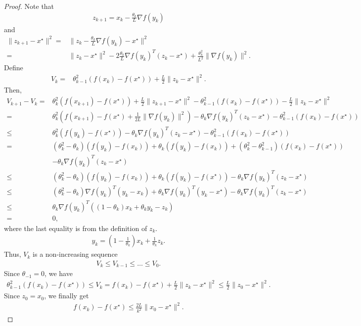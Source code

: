 \documentclass{article}
\begin{document}
\begin{proof}
    Note that 
    \begin{align}
        z_{k+1} = x_k - \frac{\theta_k}{L}\nabla f(y_k)
    \end{align}
    and 
    \begin{align}
        \|z_{k+1}-x^\star\|^2 =&  \| z_k - \frac{\theta_k}{L}\nabla f(y_k)-x^\star\|^2 \\
        =& \|z_k - x^\star\|^2 -2\frac{\theta_k}{L} \nabla f(y_k)^T (z_k - x^\star) + \frac{\theta_k^2}{L^2} \|\nabla f(y_k)\|^2.
    \end{align}
    Define
    \begin{align}
        V_k =& \theta_{k-1}^2 (f(x_k)-f(x^\star)) + \frac{L}{2}\|z_k-x^\star\|^2.
    \end{align}
    Then,
    \begin{align}
        V_{k+1}-V_k =&  \theta_{k}^2 (f(x_{k+1})-f(x^\star)) + \frac{L}{2}\|z_{k+1}-x^\star\|^2
        -\theta_{k-1}^2 (f(x_k)-f(x^\star)) - \frac{L}{2}\|z_k-x^\star\|^2\\
        =& \theta_k^2 \left( f(x_{k+1})- f(x^\star) + \frac{1}{2L}\|\nabla f(y_k)\|^2\right) -\theta_k \nabla f(y_k)^T (z_k - x^\star)  -\theta_{k-1}^2 (f(x_k)-f(x^\star)) \\
        \leq& \theta_k^2 \left( f(y_{k})- f(x^\star)\right) -\theta_k \nabla f(y_k)^T (z_k - x^\star)  -\theta_{k-1}^2 (f(x_k)-f(x^\star)) \\
        =& (\theta_k^2 -\theta_k)( f(y_k) - f(x_k)) + \theta_k (f(y_k)- f(x_k)) + (\theta_k^2-\theta_{k-1}^2)(f(x_k)-f(x^\star))\nonumber\\
        &-\theta_k \nabla f(y_k)^T (z_k-x^\star)\\
        \leq& (\theta_k^2 -\theta_k)( f(y_k) - f(x_k)) + \theta_k (f(y_k)- f(x^\star)) -\theta_k \nabla f(y_k)^T (z_k-x^\star)\\
        \leq& (\theta_k^2 -\theta_k)\nabla f(y_k)^T (y_k-x_k) + \theta_k \nabla f(y_k)^T(y_k-x^\star) - \theta_k \nabla f(y_k)^T (z_k-x^\star)\\
        \leq& \theta_k \nabla f(y_k)^T \left((1-\theta_k)x_k + \theta_k y_k - z_k\right)\\
        =& 0,
    \end{align}
    where the last equality is from the definition of $z_k$. 
    \begin{align}
        y_k = \left(1-\frac{1}{\theta_k}\right) x_k + \frac{1}{\theta_k}z_k.
    \end{align}
    Thus, $V_k$ is a non-increasing sequence
    \begin{align}
        V_k\leq V_{k-1}\leq\dots \leq V_0.
    \end{align}
    Since $\theta_{-1} = 0$, we have
    \begin{align}
        \theta_{k-1}^2 (f(x_k) - f(x^\star)) \leq V_k = f(x_k)-f(x^\star) + \frac{L}{2} \|z_k - x^\star\|^2 \leq \frac{L}{2} \|z_0-x^\star\|^2.
    \end{align}
    Since $z_0 = x_0$, we finally get
    \begin{align}
        f(x_k) - f(x^\star)  \leq \frac{2L}{k^2} \|x_0-x^\star\|^2.
    \end{align}
    
\end{proof}
\end{document}
